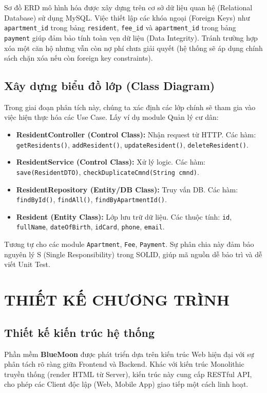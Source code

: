 \documentclass[12pt,a4paper]{article}
\begin{document}
Sơ đồ ERD mô hình hóa được xây dựng trên cơ sở dữ liệu quan hệ (Relational Database) sử dụng MySQL. Việc thiết lập các khóa ngoại (Foreign Keys) như \texttt{apartment\_id} trong bảng \texttt{resident}, \texttt{fee\_id} và \texttt{apartment\_id} trong bảng \texttt{payment} giúp đảm bảo tính toàn vẹn dữ liệu (Data Integrity). Tránh trường hợp xóa một căn hộ nhưng vẫn còn nợ phí chưa giải quyết (hệ thống sẽ áp dụng chính sách chặn xóa nếu còn foreign key constraints).

\subsection{Xây dựng biểu đồ lớp (Class Diagram)}

Trong giai đoạn phân tích này, chúng ta xác định các lớp chính sẽ tham gia vào việc hiện thực hóa các Use Case. Lấy ví dụ module Quản lý cư dân:

\begin{itemize}
    \item \textbf{ResidentController (Control Class):} Nhận request từ HTTP. Các hàm: \texttt{getResidents()}, \texttt{addResident()}, \texttt{updateResident()}, \texttt{deleteResident()}.
    \item \textbf{ResidentService (Control Class):} Xử lý logic. Các hàm: \texttt{save(ResidentDTO)}, \texttt{checkDuplicateCmnd(String cmnd)}.
    \item \textbf{ResidentRepository (Entity/DB Class):} Truy vấn DB. Các hàm: \texttt{findById()}, \texttt{findAll()}, \texttt{findByApartmentId()}.
    \item \textbf{Resident (Entity Class):} Lớp lưu trữ dữ liệu. Các thuộc tính: \texttt{id}, \texttt{fullName}, \texttt{dateOfBirth}, \texttt{idCard}, \texttt{phone}, \texttt{email}.
\end{itemize}
Tương tự cho các module \texttt{Apartment}, \texttt{Fee}, \texttt{Payment}. Sự phân chia này đảm bảo nguyên lý S (Single Responsibility) trong SOLID, giúp mã nguồn dễ bảo trì và dễ viết Unit Test.

\section{THIẾT KẾ CHƯƠNG TRÌNH}

\subsection{Thiết kế kiến trúc hệ thống}

Phần mềm \textbf{BlueMoon} được phát triển dựa trên kiến trúc Web hiện đại với sự phân tách rõ ràng giữa Frontend và Backend. Khác với kiến trúc Monolithic truyền thống (render HTML từ Server), kiến trúc này cung cấp RESTful API, cho phép các Client độc lập (Web, Mobile App) giao tiếp một cách linh hoạt.
\end{document}
